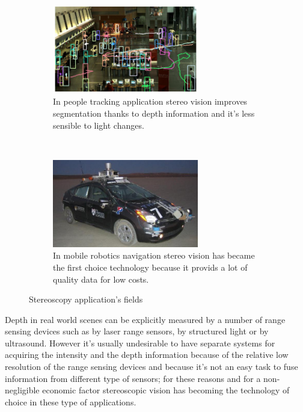 \begin{figure}[h!]
\centering
\begin{subfigure}[]{0.5\textwidth}
		\centering
        \includegraphics[width=0.7\textwidth]{./img/tracking.jpg}
                \caption{\scriptsize{In people tracking application stereo vision improves segmentation thanks to depth information and it's less sensible to light changes.}}
\end{subfigure}%
~ \quad
\begin{subfigure}[]{0.5\textwidth}
		\centering
        \includegraphics[width=0.7\textwidth]{./img/little_ben.jpg}
                \caption{\scriptsize{In mobile robotics navigation stereo vision has became the first choice technology because it provids a lot of quality data for low costs.}}
\end{subfigure} 
\caption{\small{Stereoscopy application's fields}}
\end{figure}
Depth in real world scenes can be explicitly measured by a number of range sensing devices such as by laser range sensors, by structured light or by ultrasound.
However it's usually undesirable to have separate systems for acquiring the intensity and the depth
information because of the relative low resolution of the range sensing devices and because it's not an easy task to fuse information from different type of sensors; for these reasons and for a non-negligible economic factor stereoscopic vision has becoming the technology of choice in these type of applications.
